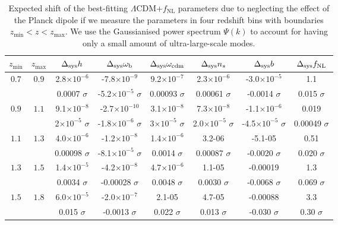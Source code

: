 \documentclass[a4paper,11pt]{article}
\begin{document}
\begin{table}[ht]
    \centering
    \begin{tabular}{|c|c|c|c|c|c|c|c|}
        \hline $z_\mathrm{min}$ & $z_\mathrm{max}$ & $\Delta_{\rm sys}h$ &
        $\Delta_{\rm sys}\omega_\mathrm{b}$ & $\Delta_{\rm sys}\omega_\mathrm{cdm}$ & $\Delta_{\rm sys}n_s$ & $\Delta_{\rm sys}b$ & $\Delta_{\rm sys}f_\mathrm{NL}$ \\\hline\hline
        $0.7$ & $0.9$  &  2.8$\times 10^{-6}$
 &  -7.8$\times 10^{-9}$
 &  9.2$\times 10^{-7}$
 &  2.3$\times 10^{-6}$
 &  -3.0$\times 10^{-5}$
 &  1.1\\ &
 &  0.0007 $\sigma$
 &  -5.2$\times 10^{-5}$ $\sigma$
 &  0.00093 $\sigma$
 &  0.00061 $\sigma$
 &  -0.0014 $\sigma$
 &  0.015 $\sigma$\\
        \hline
        $0.9$ & $1.1$  &  9.1$\times 10^{-8}$
 &  -2.7$\times 10^{-10}$
 &  3.1$\times 10^{-8}$
 &  7.3$\times 10^{-8}$
 &  -1.1$\times 10^{-6}$
 &  0.019\\  &
 &  2$\times 10^{-5}$ $\sigma$
 &  -1.8$\times 10^{-6}$ $\sigma$
 &  3$\times 10^{-5}$ $\sigma$
 &  2.0$\times 10^{-5}$ $\sigma$
 &  -4.5$\times 10^{-5}$ $\sigma$
 &  0.00049 $\sigma$
 \\\hline
        $1.1$ & $1.3$  &  4.0$\times 10^{-6}$
 &  -1.2$\times 10^{-8}$
 &  1.4$\times 10^{-6}$
 &  3.2-06
 &  -5.1-05
 &  0.51\\ &
 &  0.00098 $\sigma$
 &  -8.1$\times 10^{-5}$ $\sigma$
 &  0.0014 $\sigma$
 &  0.00087 $\sigma$
 &  -0.0020 $\sigma$
 &  0.020 $\sigma$\\
        \hline
        $1.3$ & $1.5$  &  1.4$\times 10^{-5}$
 &  -4.2$\times 10^{-8}$
 &  4.7$\times 10^{-6}$
 &  1.1-05
 &  -0.00019
 &  1.3\\ &
 &  0.0034 $\sigma$
 &  -0.00028 $\sigma$
 &  0.0048 $\sigma$
 &  0.0030 $\sigma$
 &  -0.0068 $\sigma$
 &  0.069 $\sigma$
\\\hline
        $1.5$ & $1.8$ &  6.0$\times 10^{-5}$
 &  -2.0$\times 10^{-7}$
 &  2.1-05
 &  4.7-05
 &  -0.00088
 &  3.3\\ &
 &  0.015 $\sigma$
 &  -0.0013 $\sigma$
 &  0.022 $\sigma$
 &  0.013 $\sigma$
 &  -0.030 $\sigma$
 &  0.30 $\sigma$\\\hline
    \end{tabular}
    \caption{Expected shift of the best-fitting $\Lambda$CDM+$f_\mathrm{NL}$ parameters due to neglecting the effect of the Planck dipole if we measure the parameters in four redshift bins with boundaries $z_\mathrm{min} < z < z_\mathrm{max}$. We use the Gaussianised power spectrum $\Psi(k)$ to account for having only a small amount of ultra-large-scale modes.}
    \label{tab:FS_shifts_in_z_bins}
\end{table}
\end{document}
